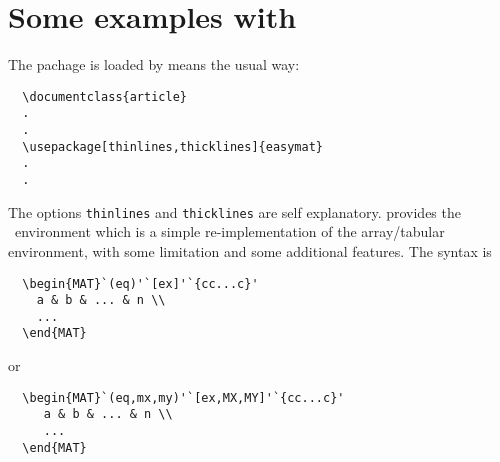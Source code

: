 \documentclass[a4paper,final,11pt]{article}
\begin{document}
\section{Some examples with }
The pachage is loaded by means the usual way:
\begin{verbatim}
  \documentclass{article}
  .
  .
  \usepackage[thinlines,thicklines]{easymat}
  .
  .
\end{verbatim}
The options \texttt{thinlines} and \texttt{thicklines} are self explanatory.
 provides the ~environment which is a
simple re-implementation of the
array/tabular environment, with some limitation and some additional features.
The syntax is
\begin{verbatim}
  \begin{MAT}`(eq)'`[ex]'`{cc...c}'
    a & b & ... & n \\
    ...
  \end{MAT}
\end{verbatim}
or
\begin{verbatim}
  \begin{MAT}`(eq,mx,my)'`[ex,MX,MY]'`{cc...c}'
     a & b & ... & n \\
     ...
  \end{MAT}
\end{verbatim}
\end{document}
